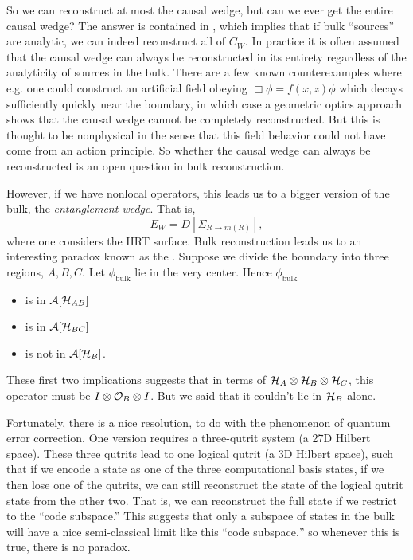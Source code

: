 So we can reconstruct at most the causal wedge, but can we ever get the entire causal wedge? The answer is contained in , which implies that if bulk ``sources'' are analytic, we can indeed reconstruct all of $C_W$. In practice it is often assumed that the causal wedge can always be reconstructed in its entirety regardless of the analyticity of sources in the bulk. There are a few known counterexamples where e.g. one could construct an artificial field obeying $\Box \phi=f(x,z)\phi$ which decays sufficiently quickly near the boundary, in which case a geometric optics approach shows that the causal wedge cannot be completely reconstructed. But this is thought to be nonphysical in the sense that this field behavior could not have come from an action principle. So whether the causal wedge can always be reconstructed is an open question in bulk reconstruction.

However, if we have nonlocal operators, this leads us to a bigger version of the bulk, the \emph{entanglement wedge}. That is,
\begin{equation}
    E_W=D[\Sigma_{R\to m(R)}],
\end{equation}
where one considers the HRT surface.
Bulk reconstruction leads us to an interesting paradox known as the . Suppose we divide the boundary into three regions, $A,B,C$. Let $\phi_\text{bulk}$ lie in the very center. 
Hence $\phi_\text{bulk}$
\begin{itemize}
    \item is in $\mathcal{A}[\mathcal H_{AB}]$
    \item is in $\mathcal{A}[\mathcal H_{BC}]$
    \item is not in $\mathcal{A}[\mathcal H_{B}]$.
\end{itemize}
These first two implications suggests that in terms of $\mathcal H_A \otimes \mathcal H_B \otimes \mathcal H_C$, this operator must be $I\otimes \mathcal O_B \otimes I$. But we said that it couldn't lie in $\mathcal H_B$ alone.

Fortunately, there is a nice resolution, to do with the phenomenon of quantum error correction. One version requires a three-qutrit system (a 27D Hilbert space). These three qutrits lead to one logical qutrit (a 3D Hilbert space), such that if we encode a state as one of the three computational basis states, if we then lose one of the qutrits, we can still reconstruct the state of the logical qutrit state from the other two. That is, we can reconstruct the full state if we restrict to the ``code subspace.'' This suggests that only a subspace of states in the bulk will have a nice semi-classical limit like this ``code subspace,'' so whenever this is true, there is no paradox.